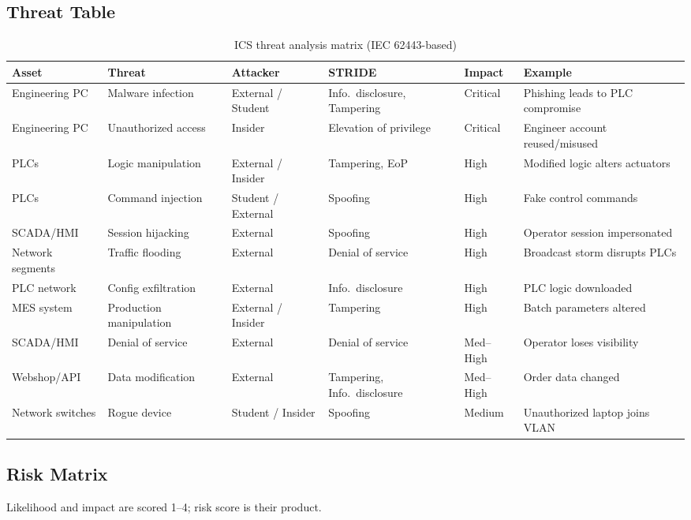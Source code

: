 \documentclass[11pt,a4paper]{article}
\begin{document}
\subsection{Threat Table}
{\small
\setlength{\tabcolsep}{4pt}
\begin{longtable}{L{2.2cm} L{2.6cm} L{2.2cm} L{2.8cm} L{1.4cm} L{2.2cm}}
\caption{ICS threat analysis matrix (IEC 62443-based)}\\
\toprule
\textbf{Asset} & \textbf{Threat} & \textbf{Attacker} & \textbf{STRIDE} & \textbf{Impact} & \textbf{Example} \\
\midrule \endhead
Engineering PC & Malware infection & External / Student & Info.\ disclosure, Tampering & Critical & Phishing leads to PLC compromise \\
Engineering PC & Unauthorized access & Insider & Elevation of privilege & Critical & Engineer account reused/misused \\
PLCs & Logic manipulation & External / Insider & Tampering, EoP & High & Modified logic alters actuators \\
PLCs & Command injection & Student / External & Spoofing & High & Fake control commands \\
SCADA/HMI & Session hijacking & External & Spoofing & High & Operator session impersonated \\
Network segments & Traffic flooding & External & Denial of service & High & Broadcast storm disrupts PLCs \\
PLC network & Config exfiltration & External & Info.\ disclosure & High & PLC logic downloaded \\
MES system & Production manipulation & External / Insider & Tampering & High & Batch parameters altered \\
SCADA/HMI & Denial of service & External & Denial of service & Med--High & Operator loses visibility \\
Webshop/API & Data modification & External & Tampering, Info.\ disclosure & Med--High & Order data changed \\
Network switches & Rogue device & Student / Insider & Spoofing & Medium & Unauthorized laptop joins VLAN \\
\bottomrule
\end{longtable}
}

\subsection{Risk Matrix}
Likelihood and impact are scored 1--4; risk score is their product.
\end{document}
